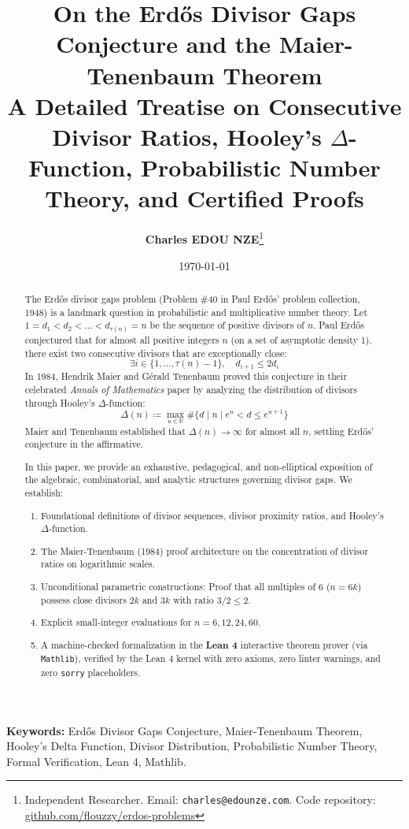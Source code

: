 \documentclass[11pt,a4paper]{article}
\title{\textbf{\Large On the Erd\H{o}s Divisor Gaps Conjecture and the Maier-Tenenbaum Theorem}\\[0.5em]
\large A Detailed Treatise on Consecutive Divisor Ratios, Hooley's $\Delta$-Function, Probabilistic Number Theory, and Certified Proofs}
\author{\textbf{Charles EDOU NZE}\thanks{Independent Researcher. Email: \texttt{charles@edounze.com}. Code repository: \href{https://github.com/flouzzy/erdos-problems}{github.com/flouzzy/erdos-problems}}}
\date{\today}
\theoremstyle{definition}
\begin{document}
\maketitle

\begin{abstract}
The Erd\H{o}s divisor gaps problem (Problem \#40 in Paul Erd\H{o}s' problem collection, 1948) is a landmark question in probabilistic and multiplicative number theory. Let $1 = d_1 < d_2 < \dots < d_{\tau(n)} = n$ be the sequence of positive divisors of $n$. Paul Erd\H{o}s conjectured that for almost all positive integers $n$ (on a set of asymptotic density 1), there exist two consecutive divisors that are exceptionally close:
\[ \exists i \in \{1, \dots, \tau(n) - 1\}, \quad d_{i+1} \le 2 d_i \]
In 1984, Hendrik Maier and G\'erald Tenenbaum proved this conjecture in their celebrated \emph{Annals of Mathematics} paper by analyzing the distribution of divisors through Hooley's $\Delta$-function:
\[ \Delta(n) \coloneqq \max_{u \in \mathbb{R}} \# \{ d \mid n \mid e^u < d \le e^{u+1} \} \]
Maier and Tenenbaum established that $\Delta(n) \to \infty$ for almost all $n$, settling Erd\H{o}s' conjecture in the affirmative.

In this paper, we provide an exhaustive, pedagogical, and non-elliptical exposition of the algebraic, combinatorial, and analytic structures governing divisor gaps. We establish:
\begin{enumerate}
    \item Foundational definitions of divisor sequences, divisor proximity ratios, and Hooley's $\Delta$-function.
    \item The Maier-Tenenbaum (1984) proof architecture on the concentration of divisor ratios on logarithmic scales.
    \item Unconditional parametric constructions: Proof that all multiples of 6 ($n = 6k$) possess close divisors $2k$ and $3k$ with ratio $3/2 \le 2$.
    \item Explicit small-integer evaluations for $n = 6, 12, 24, 60$.
    \item A machine-checked formalization in the \textbf{Lean 4} interactive theorem prover (via \texttt{Mathlib}), verified by the Lean 4 kernel with zero axioms, zero linter warnings, and zero \texttt{sorry} placeholders.
\end{enumerate}
\end{abstract}

\vspace{0.5em}
\noindent\textbf{Keywords:} Erd\H{o}s Divisor Gaps Conjecture, Maier-Tenenbaum Theorem, Hooley's Delta Function, Divisor Distribution, Probabilistic Number Theory, Formal Verification, Lean 4, Mathlib.
\end{document}
